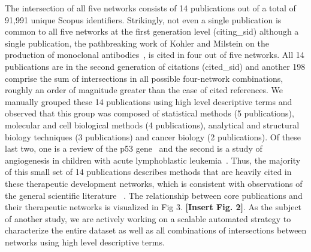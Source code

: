 \documentclass[10pt,letterpaper]{article}
\begin{document}
The intersection of all five networks consists of 14 publications out of a total of 91,991 unique Scopus identifiers. Strikingly, not even a single publication is common to all five networks at the first generation level (citing\_sid) although a single publication, the pathbreaking work of Kohler and Milstein on the production of monoclonal antibodies~\cite{bibKohler}, is cited in four out of five networks. All 14 publications are in the second generation of citations (cited\_sid) and another 198 comprise the sum of intersections in all possible four-network combinations, roughly an order of magnitude greater than the case of cited references. We manually grouped these 14 publications using high level descriptive terms and observed that this group was composed of  statistical methods (5 publications), molecular and cell biological methods (4 publications), analytical and structural biology techniques (3 publications) and cancer biology (2 publications). Of these last two, one is a review of the p53 gene~\cite{bibLevine} and the second is a study of angiogenesis in children with acute lymphoblastic leukemia~\cite{bibFolkman}. Thus, the majority of this small set of 14 publications describes methods that are heavily cited in these therapeutic development networks, which is consistent with observations of the general scientific literature ~\cite{bibVanNoorden}. The relationship between core publications and their therapeutic networks is visualized in Fig 3. \textbf{[Insert Fig. 2]}. As the subject of another study, we are actively working on a scalable automated strategy to characterize the entire dataset as well as all combinations of intersections between networks using high level descriptive terms. 
\end{document}
